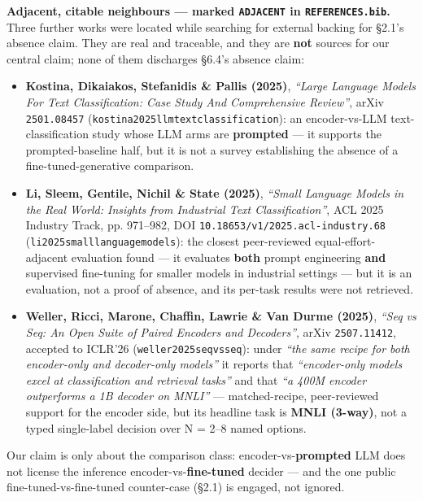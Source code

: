 \documentclass[10pt]{article}
\begin{document}
\textbf{Adjacent, citable neighbours --- marked \texttt{ADJACENT} in \texttt{REFERENCES.bib}.} Three further works were located while searching for external backing for \S2.1's absence claim. They are real and traceable, and they are \textbf{not} sources for our central claim; none of them discharges \S6.4's absence claim:

\begin{itemize}
\item \textbf{Kostina, Dikaiakos, Stefanidis \& Pallis (2025)}, \emph{``Large Language Models For Text Classification: Case Study And Comprehensive Review''}, arXiv \texttt{2501.08457} (\texttt{kostina2025llmtextclassification}\cite{kostina2025llmtextclassification}): an encoder-vs-LLM text-classification study whose LLM arms are \textbf{prompted} --- it supports the prompted-baseline half, but it is not a survey establishing the absence of a fine-tuned-generative comparison.
\item \textbf{Li, Sleem, Gentile, Nichil \& State (2025)}, \emph{``Small Language Models in the Real World: Insights from Industrial Text Classification''}, ACL 2025 Industry Track, pp. 971--982, DOI \texttt{10.18653/v1/2025.acl-industry.68} (\texttt{li2025smalllanguagemodels}\cite{li2025smalllanguagemodels}): the closest peer-reviewed equal-effort-adjacent evaluation found --- it evaluates \textbf{both} prompt engineering \textbf{and} supervised fine-tuning for smaller models in industrial settings --- but it is an evaluation, not a proof of absence, and its per-task results were not retrieved.
\item \textbf{Weller, Ricci, Marone, Chaffin, Lawrie \& Van Durme (2025)}, \emph{``Seq vs Seq: An Open Suite of Paired Encoders and Decoders''}, arXiv \texttt{2507.11412}, accepted to ICLR'26 (\texttt{weller2025seqvsseq}\cite{weller2025seqvsseq}): under \emph{``the same recipe for both encoder-only and decoder-only models''} it reports that \emph{``encoder-only models excel at classification and retrieval tasks''} and that \emph{``a 400M encoder outperforms a 1B decoder on MNLI''} --- matched-recipe, peer-reviewed support for the encoder side, but its headline task is \textbf{MNLI (3-way)}, not a typed single-label decision over N = 2--8 named options.
\end{itemize}

Our claim is only about the comparison class: encoder-vs-\textbf{prompted} LLM does not license the inference encoder-vs-\textbf{fine-tuned} decider --- and the one public fine-tuned-vs-fine-tuned counter-case (\S2.1) is engaged, not ignored.
\end{document}
